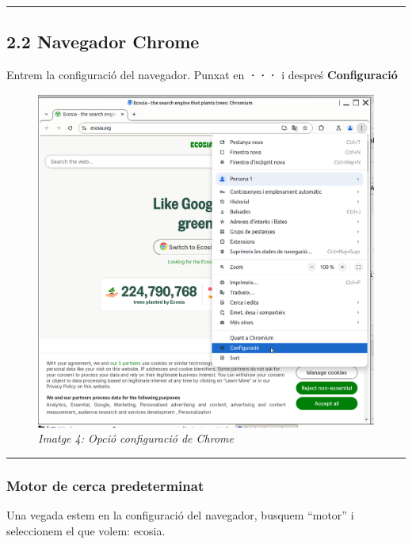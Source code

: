 \documentclass[
  a4paper,
]{article}
\begin{document}
\begin{center}\rule{0.5\linewidth}{0.5pt}\end{center}

\subsection{2.2 Navegador Chrome}\label{navegador-chrome}

Entrem la configuració del navegador. Punxat en \textbf{···} i despreś
\textbf{Configuració}

\begin{figure}
\centering
\includegraphics{png/1-Chrome-Configuracio.png}
\caption{\emph{Imatge 4: Opció configuració de Chrome}}
\end{figure}

\begin{center}\rule{0.5\linewidth}{0.5pt}\end{center}

\subsubsection{Motor de cerca
predeterminat}\label{motor-de-cerca-predeterminat-1}

Una vegada estem en la configuració del navegador, busquem ``motor'' i
seleccionem el que volem: ecosia.
\end{document}
